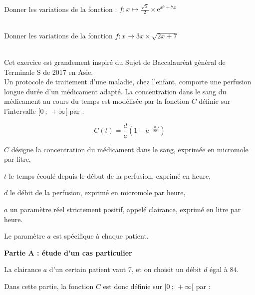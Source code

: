 \documentclass[12pt,fleqn]{report} %
\begin{document}
\begin{exercise}\label{Exercice 22}\text{ }\\
	Donner les variations de la fonction : $f : x \mapsto \frac{\sqrt{2}}{2}\times\text{e}^{x^3+7x}$
\end{exercise}

\begin{exercise}\label{Exercice 38}\text{ }\\
	Donner les variations de la fonction $f : x \mapsto 3x \times \sqrt{2x+7}$
\end{exercise}

\begin{exercise}\label{Exercice 46}\text{ }\\
	Cet exercice est grandement inspiré du Sujet de Baccalauréat général de Terminale S de 2017 en Asie.\\
	Un protocole de traitement d'une maladie, chez l'enfant, comporte une perfusion longue durée d'un
	médicament adapté. La concentration dans le sang du médicament au cours du temps est modélisée
	par la fonction $C$ définie sur l'intervalle $[0~;~+ \infty[$ par :
	
	\[C(t) = \dfrac{d}{a}\left(1 - \text{e}^{-\frac{a}{80} t}\right)\]
	
	\begin{list}{\textbullet}{où}
		\item $C$ désigne la concentration du médicament dans le sang, exprimée en micromole par litre,
		
		\item $t$ le temps écoulé depuis le début de la perfusion, exprimé en heure,
		
		\item $d$ le débit de la perfusion, exprimé en micromole par heure,
		
		\item $a$ un paramètre réel strictement positif, appelé clairance, exprimé en litre par heure.
		
	\end{list}
	
	Le paramètre $a$ est spécifique à chaque patient.
	
	\bigskip
	
	\textbf{Partie A : étude d'un cas particulier}
	
	\medskip
	
	La clairance $a$ d'un certain patient vaut 7, et on choisit un débit $d$ égal à $84$.
	
	Dans cette partie, la fonction $C$ est donc définie sur $[0~;~+ \infty[$ par : 
	

\end{exercise}
\end{document}
